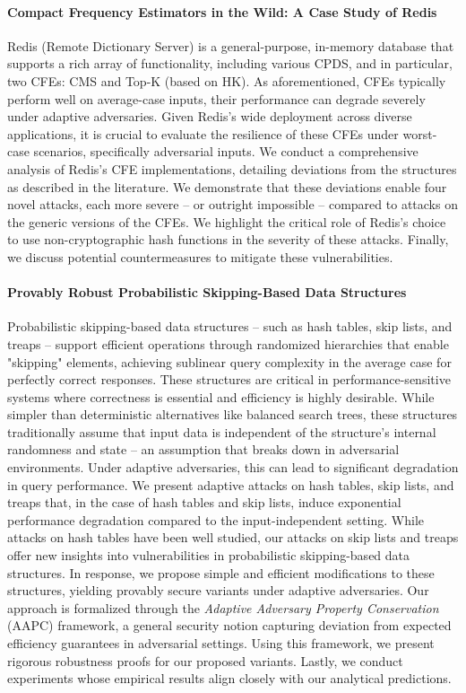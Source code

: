 \paragraph{Compact Frequency Estimators in the Wild: A Case Study of Redis} Redis (Remote Dictionary Server) is a general-purpose, in-memory database that supports a rich array of functionality, including various CPDS, and in particular, two CFEs: CMS and Top-K (based on HK). As aforementioned, CFEs typically perform well on average-case inputs, their performance can degrade severely under adaptive adversaries. Given Redis’s wide deployment across diverse applications, it is crucial to evaluate the resilience of these CFEs under worst-case scenarios, specifically adversarial inputs. We conduct a comprehensive analysis of Redis’s CFE implementations, detailing deviations from the structures as described in the literature. We demonstrate that these deviations enable four novel attacks, each more severe -- or outright impossible -- compared to attacks on the generic versions of the CFEs. We highlight the critical role of Redis’s choice to use non-cryptographic hash functions in the severity of these attacks. Finally, we discuss potential countermeasures to mitigate these vulnerabilities.

\paragraph{Provably Robust Probabilistic Skipping-Based Data Structures} Probabilistic skipping-based data structures -- such as hash tables, skip lists, and treaps -- support efficient operations through randomized hierarchies that enable "skipping" elements, achieving sublinear query complexity in the average case for perfectly correct responses. These structures are critical in performance-sensitive systems where correctness is essential and efficiency is highly desirable. While simpler than deterministic alternatives like balanced search trees, these structures traditionally assume that input data is independent of the structure’s internal randomness and state -- an assumption that breaks down in adversarial environments. Under adaptive adversaries, this can lead to significant degradation in query performance. We present adaptive attacks on hash tables, skip lists, and treaps that, in the case of hash tables and skip lists, induce exponential performance degradation compared to the input-independent setting. While attacks on hash tables have been well studied, our attacks on skip lists and treaps offer new insights into vulnerabilities in probabilistic skipping-based data structures. In response, we propose simple and efficient modifications to these structures, yielding provably secure variants under adaptive adversaries. Our approach is formalized through the \emph{Adaptive Adversary Property Conservation} (AAPC) framework, a general security notion capturing deviation from expected efficiency guarantees in adversarial settings. Using this framework, we present rigorous robustness proofs for our proposed variants. Lastly, we conduct experiments whose empirical results align closely with our analytical predictions.

